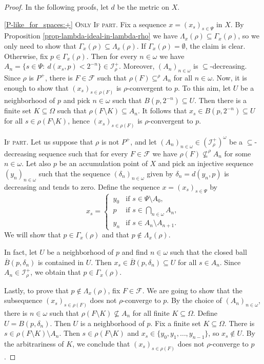 \documentclass{amsart}
\theoremstyle{plain}
\theoremstyle{definition}
\theoremstyle{remark}
\newcommand{\cF}{\mathcal{F}}
\newcommand{\cI}{\mathcal{I}}
\newcommand{\I}{\cI}
\begin{document}
\begin{proof}
In the following proofs, let $d$ be the metric on $X$. 

\ref{P-like_for_spaces:+} 
\textsc{Only If part.} 
Fix a sequence $x=(x_s)_{s\in\Psi}$ in $X$. By Proposition \ref{prop-lambda-ideal-in-lambda-rho} we have $\Lambda_x(\rho)\subseteq\Gamma_x(\rho)$, so we only need to show that $\Gamma_x(\rho)\subseteq \Lambda_x(\rho)$. If $\Gamma_x(\rho)=\emptyset$, the claim is clear. Otherwise, fix $p\in \Gamma_x(\rho)$. Then for every $n\in\omega$ we have $A_n=\{s\in \Psi:\ d(x_s,p)<2^{-n}\}\in\I_\rho^+$. Moreover, $(A_n)_{n\in\omega}$ is $\subseteq$-decreasing. Since $\rho$ is $P^+$, there is $F\in\cF$ such that $\rho(F)\subseteq^\rho A_n$ for all $n\in\omega$. Now, it is enough to show that $(x_s)_{s\in\rho(F)}$ is $\rho$-convergent to $p$. To this aim, let $U$ be a neighborhood of $p$ and pick $n\in\omega$ such that $B(p,2^{-n})\subseteq U$. Then there is a finite set $K\subseteq\Omega$ such that $\rho(F\setminus K)\subseteq A_n$. It follows that $x_s\in B(p,2^{-n})\subseteq U$ for all $s\in \rho(F\setminus K)$, hence $(x_s)_{s\in\rho(F)}$ is $\rho$-convergent to $p$. 


\textsc{If part.} Let us suppose that $\rho$ is not $P^+$, and let $(A_n)_{n\in\omega}\in (\I_{\rho}^+)^\omega$ be a $\subseteq$-decreasing sequence such that for every $F\in\cF$ we have $\rho(F)\not\subseteq^\rho A_n$ for some $n\in\omega$. Let also $p$ be an accumulation point of $X$ and pick an injective sequence $(y_n)_{n\in\omega}$ such that the sequence $(\delta_n)_{n\in\omega}$ given by $\delta_n=d(y_n,p)$ is decreasing and tends to zero. Define the sequence $x=(x_s)_{s\in\Psi}$ by 
\begin{equation*}
x_{s}=\begin{cases}
    \,y_0 &\text{if }s\in\Psi\setminus A_0,\\
    \,p &\text{if }s\in\bigcap_{n\in\omega}A_n,\\
    \,y_n &\text{if }s\in A_n\setminus A_{n+1}.
\end{cases}
\end{equation*}
We will show that $p\in\Gamma_x(\rho)$ and that $p\notin\Lambda_x(\rho)$. 
 
In fact, let $U$ be a neighborhood of $p$ and find $n\in\omega$ such that the closed ball $\overline{B}(p,\delta_n)$ is contained in $U$. Then $x_s\in \overline{B}(p,\delta_n)\subseteq U$ for all $s\in A_n$. Since $A_n\in\I_\rho^+$, we obtain that $p\in\Gamma_x(\rho)$.

Lastly, to prove that $p\notin\Lambda_x(\rho)$, fix $F\in\cF$. We are going to show that the subsequence $(x_s)_{s\in\rho(F)}$ does not $\rho$-converge to $p$. By the choice of $(A_n)_{n\in\omega}$, there is $n\in\omega$ such that $\rho(F\setminus K)\not\subseteq A_n$ for all finite $K\subseteq\Omega$. Define $U=B(p,\delta_n)$. Then $U$ is a neighborhood of $p$. Fix a finite set $K\subseteq\Omega$. There is $s\in \rho(F\setminus K)\setminus A_n$. Then $s\in \rho(F\setminus K)$ and $x_s\in\{y_0,y_1,\ldots,y_{n-1}\}$, so $x_s\notin U$. By the arbitrariness of $K$, we conclude that $(x_s)_{s\in\rho(F)}$ does not $\rho$-converge to $p$.



\end{proof}
\end{document}
